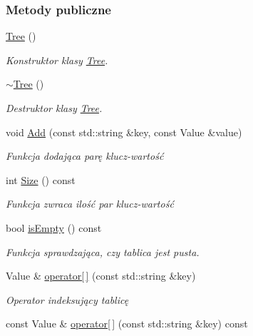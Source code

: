 \subsubsection*{Metody publiczne}
\begin{DoxyCompactItemize}
\item 
\hyperlink{class_tree_a43d09ee43b49a0dd0cfb5c739f799103}{Tree} ()
\begin{DoxyCompactList}\small\item\em Konstruktor klasy \hyperlink{class_tree}{Tree}. \end{DoxyCompactList}\item 
\hyperlink{class_tree_a99fe49dee447c5da682cad8a2221b021}{$\sim$\-Tree} ()
\begin{DoxyCompactList}\small\item\em Destruktor klasy \hyperlink{class_tree}{Tree}. \end{DoxyCompactList}\item 
void \hyperlink{class_tree_a06550c923534f28defc1218358798692}{Add} (const std\-::string \&key, const Value \&value)
\begin{DoxyCompactList}\small\item\em Funkcja dodająca parę klucz-\/wartość \end{DoxyCompactList}\item 
int \hyperlink{class_tree_a4e05a40472e6b68f4d3c6cad3c4ca618}{Size} () const 
\begin{DoxyCompactList}\small\item\em Funkcja zwraca ilość par klucz-\/wartość \end{DoxyCompactList}\item 
bool \hyperlink{class_tree_a4b6c137138cc1d06ed5cf4197dd5a6ad}{is\-Empty} () const 
\begin{DoxyCompactList}\small\item\em Funkcja sprawdzająca, czy tablica jest pusta. \end{DoxyCompactList}\item 
Value \& \hyperlink{class_tree_af2204aecba9c68e0835d1f9995566654}{operator\mbox{[}$\,$\mbox{]}} (const std\-::string \&key)
\begin{DoxyCompactList}\small\item\em Operator indeksujący tablicę \end{DoxyCompactList}\item 
const Value \& \hyperlink{class_tree_a344ac08c6e8637796d19bd185084cb22}{operator\mbox{[}$\,$\mbox{]}} (const std\-::string \&key) const 
\end{DoxyCompactItemize}
